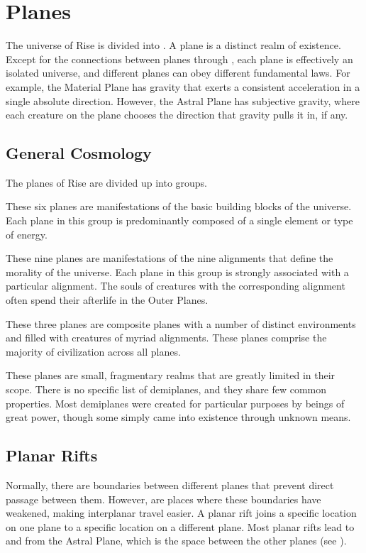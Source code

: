 \section{Planes}
    The universe of Rise is divided into .
    A plane is a distinct realm of existence.
    Except for the connections between planes through , each plane is effectively an isolated universe, and different planes can obey different fundamental laws.
    For example, the Material Plane has gravity that exerts a consistent acceleration in a single absolute direction.
    However, the Astral Plane has subjective gravity, where each creature on the plane chooses the direction that gravity pulls it in, if any.

    \subsection{General Cosmology}
        The planes of Rise are divided up into groups.

         These six planes are manifestations of the basic building blocks of the universe.
        Each plane in this group is predominantly composed of a single element or type of energy.

         These nine planes are manifestations of the nine alignments that define the morality of the universe.
        Each plane in this group is strongly associated with a particular alignment.
        The souls of creatures with the corresponding alignment often spend their afterlife in the Outer Planes.

         These three planes are composite planes with a number of distinct environments and filled with creatures of myriad alignments.
        These planes comprise the majority of civilization across all planes.

         These planes are small, fragmentary realms that are greatly limited in their scope.
        There is no specific list of demiplanes, and they share few common properties.
        Most demiplanes were created for particular purposes by beings of great power, though some simply came into existence through unknown means.

    \subsection{Planar Rifts}
        Normally, there are boundaries between different planes that prevent direct passage between them.
        However,  are places where these boundaries have weakened, making interplanar travel easier.
        A planar rift joins a specific location on one plane to a specific location on a different plane.
        Most planar rifts lead to and from the Astral Plane, which is the space between the other planes (see ).

